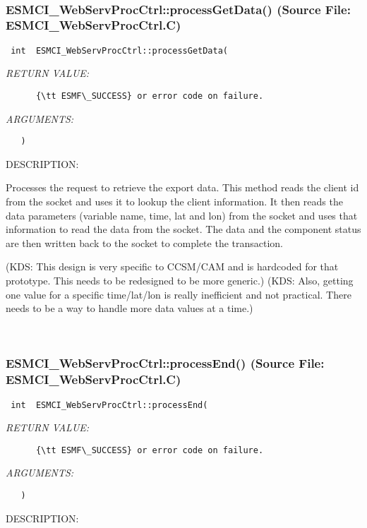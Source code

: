  
\mbox{}\hrulefill\
 
\subsubsection{ESMCI\_WebServProcCtrl::processGetData() (Source File: ESMCI\_WebServProcCtrl.C)}


  
\begin{verbatim} int  ESMCI_WebServProcCtrl::processGetData(\end{verbatim}{\em RETURN VALUE:}
\begin{verbatim}      {\tt ESMF\_SUCCESS} or error code on failure.\end{verbatim}{\em ARGUMENTS:}
\begin{verbatim}   )\end{verbatim}
{\sf DESCRIPTION:\\ }


      Processes the request to retrieve the export data.  This method
      reads the client id from the socket and uses it to lookup the client
      information.  It then reads the data parameters (variable name, time,
      lat and lon) from the socket and uses that information to read the
      data from the socket.  The data and the component status are then
      written back to the socket to complete the transaction.
  
      (KDS: This design is very specific to CCSM/CAM and is hardcoded for
            that prototype.  This needs to be redesigned to be more generic.)
      (KDS: Also, getting one value for a specific time/lat/lon is really
            inefficient and not practical.  There needs to be a way to handle
            more data values at a time.)
   
 
\mbox{}\hrulefill\
 
\subsubsection{ESMCI\_WebServProcCtrl::processEnd() (Source File: ESMCI\_WebServProcCtrl.C)}


  
\begin{verbatim} int  ESMCI_WebServProcCtrl::processEnd(\end{verbatim}{\em RETURN VALUE:}
\begin{verbatim}      {\tt ESMF\_SUCCESS} or error code on failure.\end{verbatim}{\em ARGUMENTS:}
\begin{verbatim}   )\end{verbatim}
{\sf DESCRIPTION:\\ }


